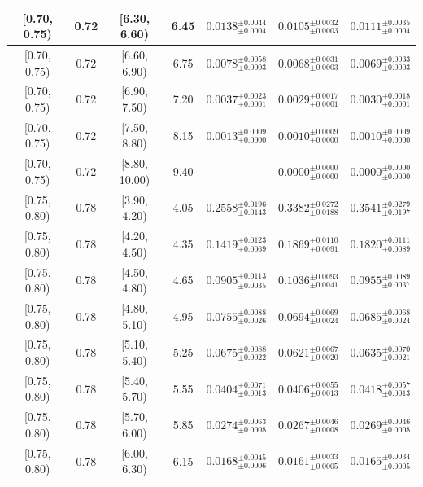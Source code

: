 \begin{longtable}{|c|c|c|c|c|c|c|}
\hline
[0.70, 0.75) & 0.72 & [6.30, 6.60) & 6.45 & $0.0138^{ \pm 0.0044 }_{ \pm 0.0004 }$ & $0.0105^{ \pm 0.0032 }_{ \pm 0.0003 }$ & $0.0111^{ \pm 0.0035 }_{ \pm 0.0004 }$ \\ 
\hline
[0.70, 0.75) & 0.72 & [6.60, 6.90) & 6.75 & $0.0078^{ \pm 0.0058 }_{ \pm 0.0003 }$ & $0.0068^{ \pm 0.0031 }_{ \pm 0.0003 }$ & $0.0069^{ \pm 0.0033 }_{ \pm 0.0003 }$ \\ 
\hline
[0.70, 0.75) & 0.72 & [6.90, 7.50) & 7.20 & $0.0037^{ \pm 0.0023 }_{ \pm 0.0001 }$ & $0.0029^{ \pm 0.0017 }_{ \pm 0.0001 }$ & $0.0030^{ \pm 0.0018 }_{ \pm 0.0001 }$ \\ 
\hline
[0.70, 0.75) & 0.72 & [7.50, 8.80) & 8.15 & $0.0013^{ \pm 0.0009 }_{ \pm 0.0000 }$ & $0.0010^{ \pm 0.0009 }_{ \pm 0.0000 }$ & $0.0010^{ \pm 0.0009 }_{ \pm 0.0000 }$ \\ 
\hline
[0.70, 0.75) & 0.72 & [8.80, 10.00) & 9.40 & - & $0.0000^{ \pm 0.0000 }_{ \pm 0.0000 }$ & $0.0000^{ \pm 0.0000 }_{ \pm 0.0000 }$ \\ 
\hline
[0.75, 0.80) & 0.78 & [3.90, 4.20) & 4.05 & $0.2558^{ \pm 0.0196 }_{ \pm 0.0143 }$ & $0.3382^{ \pm 0.0272 }_{ \pm 0.0188 }$ & $0.3541^{ \pm 0.0279 }_{ \pm 0.0197 }$ \\ 
\hline
[0.75, 0.80) & 0.78 & [4.20, 4.50) & 4.35 & $0.1419^{ \pm 0.0123 }_{ \pm 0.0069 }$ & $0.1869^{ \pm 0.0110 }_{ \pm 0.0091 }$ & $0.1820^{ \pm 0.0111 }_{ \pm 0.0089 }$ \\ 
\hline
[0.75, 0.80) & 0.78 & [4.50, 4.80) & 4.65 & $0.0905^{ \pm 0.0113 }_{ \pm 0.0035 }$ & $0.1036^{ \pm 0.0093 }_{ \pm 0.0041 }$ & $0.0955^{ \pm 0.0089 }_{ \pm 0.0037 }$ \\ 
\hline
[0.75, 0.80) & 0.78 & [4.80, 5.10) & 4.95 & $0.0755^{ \pm 0.0088 }_{ \pm 0.0026 }$ & $0.0694^{ \pm 0.0069 }_{ \pm 0.0024 }$ & $0.0685^{ \pm 0.0068 }_{ \pm 0.0024 }$ \\ 
\hline
[0.75, 0.80) & 0.78 & [5.10, 5.40) & 5.25 & $0.0675^{ \pm 0.0088 }_{ \pm 0.0022 }$ & $0.0621^{ \pm 0.0067 }_{ \pm 0.0020 }$ & $0.0635^{ \pm 0.0070 }_{ \pm 0.0021 }$ \\ 
\hline
[0.75, 0.80) & 0.78 & [5.40, 5.70) & 5.55 & $0.0404^{ \pm 0.0071 }_{ \pm 0.0013 }$ & $0.0406^{ \pm 0.0055 }_{ \pm 0.0013 }$ & $0.0418^{ \pm 0.0057 }_{ \pm 0.0013 }$ \\ 
\hline
[0.75, 0.80) & 0.78 & [5.70, 6.00) & 5.85 & $0.0274^{ \pm 0.0063 }_{ \pm 0.0008 }$ & $0.0267^{ \pm 0.0046 }_{ \pm 0.0008 }$ & $0.0269^{ \pm 0.0046 }_{ \pm 0.0008 }$ \\ 
\hline
[0.75, 0.80) & 0.78 & [6.00, 6.30) & 6.15 & $0.0168^{ \pm 0.0045 }_{ \pm 0.0006 }$ & $0.0161^{ \pm 0.0033 }_{ \pm 0.0005 }$ & $0.0165^{ \pm 0.0034 }_{ \pm 0.0005 }$ \\ 

\end{longtable}
